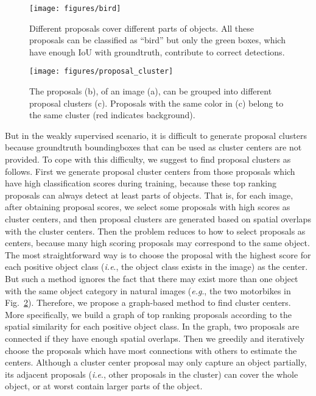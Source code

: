 \documentclass[10pt,journal,compsoc]{IEEEtran}
\def\eg{\emph{e.g}.} \def\Eg{\emph{E.g}.}
\def\ie{\emph{i.e}.} \def\Ie{\emph{I.e}.}
\begin{document}
\begin{figure}[t]
\begin{center}
   \texttt{[image: figures/bird]}
\end{center}
   \caption{Different proposals cover different parts of objects.
   All these proposals can be classified as ``bird''
   but only the green boxes, which have enough IoU with groundtruth, contribute to correct detections.
   }
\label{fig:bird}
\end{figure}

\begin{figure}[t]
\begin{center}
   \texttt{[image: figures/proposal\_cluster]}
\end{center}
   \caption{The proposals (b), of an image (a), can be grouped into different proposal clusters (c).
   Proposals with the same color in (c) belong to the same cluster (red indicates background).}
\label{fig:proposal_cluster}
\end{figure}

But in the weakly supervised scenario,
it is difficult to generate proposal clusters
because groundtruth boundingboxes that can be used as cluster centers are not provided.
To cope with this difficulty, we suggest to find proposal clusters as follows.
First we generate proposal cluster centers
from those proposals which have high classification scores during training,
because these top ranking proposals can always detect at least parts of objects.
That is, for each image, after obtaining proposal scores, we select some proposals with high scores as cluster centers,
and then proposal clusters are generated based on spatial overlaps with the cluster centers.
Then the problem reduces to how to select proposals as centers,
because many high scoring proposals may correspond to the same object.
The most straightforward way is to choose the proposal with the highest score for each positive object class (\ie, the object class exists in the image) as the center.
But such a method ignores the fact that there may exist more than one object with the same object category in natural images (\eg, the two motorbikes in Fig.~\ref{fig:proposal_cluster}).
Therefore, we propose a graph-based method to find cluster centers.
More specifically, we build a graph of top ranking proposals according to the spatial similarity for each positive object class.
In the graph, two proposals are connected if they have enough spatial overlaps.
Then we greedily and iteratively choose the proposals which have most connections with others to estimate the centers.
Although a cluster center proposal may only capture an object partially,
its adjacent proposals (\ie, other proposals in the cluster) can cover the whole object,
or at worst contain larger parts of the object.
\end{document}
